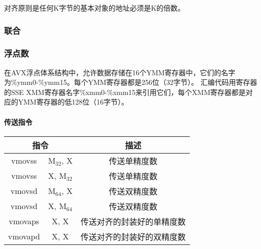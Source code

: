 对齐原则是任何K字节的基本对象的地址必须是K的倍数。

\subsubsection{联合}

\subsubsection{浮点数}
在AVX浮点体系结构中，允许数据存储在16个YMM寄存器中，它们的名字为\%ymm0-\%ymm15。每个YMM寄存器都是256位（32字节）。
汇编代码用寄存器的SSE XMM寄存器名字\%xmm0-\%xmm15来引用它们，每个XMM寄存器都是对应的YMM寄存器的低128位（16字节）。
\paragraph{传送指令}
\begin{table}[H]
    \centering
    \begin{tabular}{|c c|c|}
        \hline
        \multicolumn{2}{|c|}{\textbf{指令}} & \textbf{描述}                 \\
        \hline
        vmovss                            & M$_{32}$, X & 传送单精度数        \\
        \hline
        vmovss                            & X, M$_{32}$ & 传送单精度数        \\
        \hline
        vmovsd                            & M$_{64}$, X & 传送双精度数        \\
        \hline
        vmovsd                            & X, M$_{64}$ & 传送双精度数        \\
        \hline
        vmovaps                           & X, X        & 传送对齐的封装好的单精度数 \\
        \hline
        vmovapd                           & X, X        & 传送对齐的封装好的双精度数 \\
        \hline
    \end{tabular}
\end{table}

